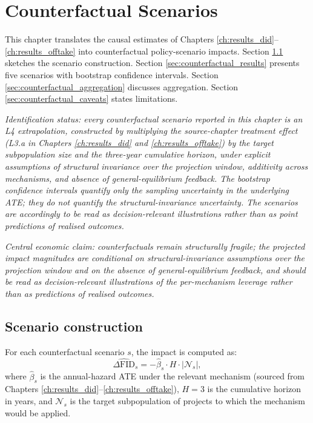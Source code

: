 \chapter{Counterfactual Scenarios}
\label{ch:counterfactual}

This chapter translates the causal estimates of Chapters \ref{ch:results_did}--\ref{ch:results_offtake} into counterfactual policy-scenario impacts. Section \ref{sec:counterfactual_methods} sketches the scenario construction. Section \ref{sec:counterfactual_results} presents five scenarios with bootstrap confidence intervals. Section \ref{sec:counterfactual_aggregation} discusses aggregation. Section \ref{sec:counterfactual_caveats} states limitations.

\noindent\emph{Identification status: every counterfactual scenario reported in this chapter is an L4 extrapolation, constructed by multiplying the source-chapter treatment effect (L3.a in Chapters \ref{ch:results_did} and \ref{ch:results_offtake}) by the target subpopulation size and the three-year cumulative horizon, under explicit assumptions of structural invariance over the projection window, additivity across mechanisms, and absence of general-equilibrium feedback. The bootstrap confidence intervals quantify only the sampling uncertainty in the underlying ATE; they do not quantify the structural-invariance uncertainty. The scenarios are accordingly to be read as decision-relevant illustrations rather than as point predictions of realised outcomes.}

\noindent\emph{Central economic claim: counterfactuals remain structurally fragile; the projected impact magnitudes are conditional on structural-invariance assumptions over the projection window and on the absence of general-equilibrium feedback, and should be read as decision-relevant illustrations of the per-mechanism leverage rather than as predictions of realised outcomes.}

\section{Scenario construction}
\label{sec:counterfactual_methods}

For each counterfactual scenario $s$, the impact is computed as:
\begin{equation}
\widehat{\Delta\text{FID}}_s = -\hat{\beta}_s \cdot H \cdot |\mathcal{N}_s|,
\label{eq:cf_delta_fid}
\end{equation}
where $\hat{\beta}_s$ is the annual-hazard ATE under the relevant mechanism (sourced from Chapters \ref{ch:results_did}--\ref{ch:results_offtake}), $H = 3$ is the cumulative horizon in years, and $\mathcal{N}_s$ is the target subpopulation of projects to which the mechanism would be applied.


